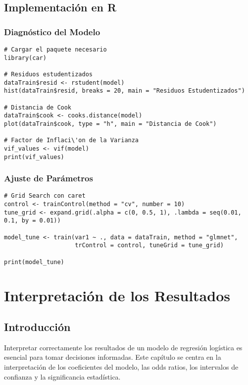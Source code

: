 \documentclass[a4paper]{report} %
\begin{document}
\section{Implementaci\'on en R}

\subsection{Diagn\'ostico del Modelo}

\begin{verbatim}
# Cargar el paquete necesario
library(car)

# Residuos estudentizados
dataTrain$resid <- rstudent(model)
hist(dataTrain$resid, breaks = 20, main = "Residuos Estudentizados")

# Distancia de Cook
dataTrain$cook <- cooks.distance(model)
plot(dataTrain$cook, type = "h", main = "Distancia de Cook")

# Factor de Inflaci\'on de la Varianza
vif_values <- vif(model)
print(vif_values)
\end{verbatim}

\subsection{Ajuste de Par\'ametros}

\begin{verbatim}
# Grid Search con caret
control <- trainControl(method = "cv", number = 10)
tune_grid <- expand.grid(.alpha = c(0, 0.5, 1), .lambda = seq(0.01, 0.1, by = 0.01))

model_tune <- train(var1 ~ ., data = dataTrain, method = "glmnet", 
                    trControl = control, tuneGrid = tune_grid)

print(model_tune)
\end{verbatim}



\chapter{Interpretaci\'on de los Resultados}

\section{Introducci\'on}

Interpretar correctamente los resultados de un modelo de regresi\'on log\'istica es esencial para tomar decisiones informadas. Este cap\'itulo se centra en la interpretaci\'on de los coeficientes del modelo, las odds ratios, los intervalos de confianza y la significancia estad\'istica.
\end{document}
